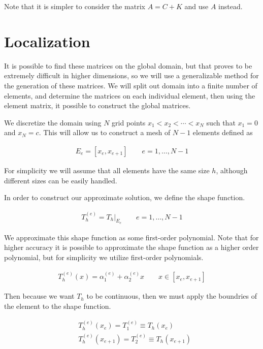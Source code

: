 \documentclass[10pt]{amsart}
\numberwithin{equation}{section}
\theoremstyle{definition}
\begin{document}
\begin{multicols}{2}
  Note that it is simpler to consider the matrix $A=C+K$ and use $A$ instead.

  \section{Localization}%
  \label{sec:localization}

  It is possible to find these matrices on the global domain, but that proves to
  be extremely difficult in higher dimensions, so we will use a generalizable
  method for the generation of these matrices. We will split out domain into a
  finite number of elements, and determine the matrices on each individual
  element, then using the element matrix, it possible to construct the global
  matrices.

  We discretize the domain using $N$ grid points $x_1<x_2<\cdots<x_N$ such that
  $x_1=0$ and $x_N=c$. This will allow us to construct a mesh of $N-1$ elements
  defined as

  \begin{align*}
    E_e=\left[x_e,x_{e+1}\right]\quad\quad e=1,\ldots,N-1
  \end{align*}

  For simplicity we will assume that all elements have the same size $h$,
  although different sizes can be easily handled.

  In order to construct our approximate solution, we define the shape function.

  \begin{align*}
    T_h^{(e)}=T_h\Bigr|_{E_e}\quad\quad e=1,\ldots,N-1
  \end{align*}

  We approximate this shape function as some first-order polynomial. Note that
  for higher accuracy it is possible to approximate the shape function as a
  higher order polynomial, but for simplicity we utilize first-order polynomials.

  \begin{align}\label{eq:the}
    T_h^{(e)}(x)=\alpha_1^{(e)}+\alpha_2^{(e)}x\quad\quad x\in\left[x_e,x_{e+1}\right]
  \end{align}

  Then because we want $T_h$ to be continuous, then we must apply the boundries
  of the element to the shape function.

  \begin{align*}
  &T_h^{(e)}(x_e)=T_1^{(e)}\equiv T_h(x_e)\\
  &T_h^{(e)}(x_{e+1})=T_2^{(e)}\equiv T_h(x_{e+1})
  \end{align*}


\end{multicols}
\end{document}

